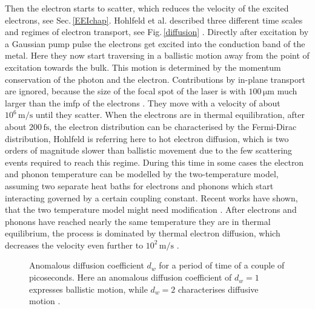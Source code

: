 \documentclass[a4paper,12pt,twoside]{article}
\begin{document}
Then the electron starts to scatter, which reduces the velocity of the excited electrons, see Sec.\,\ref{EEIchap}. Hohlfeld et al. described three different time scales and regimes of electron transport, see Fig.\,\ref{diffusion} \cite{Hohlfeld2000}. Directly after excitation by a Gaussian pump pulse the electrons get excited into the conduction band of the metal. Here they now start traversing in a ballistic motion away from the point of excitation towards the bulk. This motion is determined by the momentum conservation of the photon and the electron. Contributions by in-plane transport are ignored, because the size of the focal spot of the laser is with $100\,\mathrm{\mu m}$ much larger than the \gls{imfp} of the electrons \cite{PhysRevB.73.125105}. They move with a velocity of about $10^{6}\,\mathrm{\mbox{m/s}}$ until they scatter. When the electrons are in thermal equilibration, after about $200\,\mathrm{fs}$, the electron distribution can be characterised by the Fermi-Dirac distribution, Hohlfeld is referring here to hot electron diffusion, which is two orders of magnitude slower than ballistic movement due to the few scattering events required to reach this regime. During this time in some cases the electron and phonon temperature can be modelled by the two-temperature model, assuming two separate heat baths for electrons and phonons which start interacting governed by a certain coupling constant. Recent works have shown, that the two temperature model might need modification \cite{Lisowski2004}. After electrons and phonons have reached nearly the same temperature they are in thermal equilibrium, the process is dominated by thermal electron diffusion, which decreases the velocity even further to $10^{2}\,\mathrm{\mbox{m/s}}$ \cite{Hohlfeld2000}.
	\begin{figure}
		\caption{Anomalous diffusion coefficient $d_w$ for a period of time of a couple of picoseconds. Here an anomalous diffusion coefficient of $d_w = 1$ expresses ballistic motion, while $d_w = 2$ characterises diffusive motion \cite{Battiato2012}.}
		    \label{superdiffusion}
	\end{figure}
		
\end{document}
